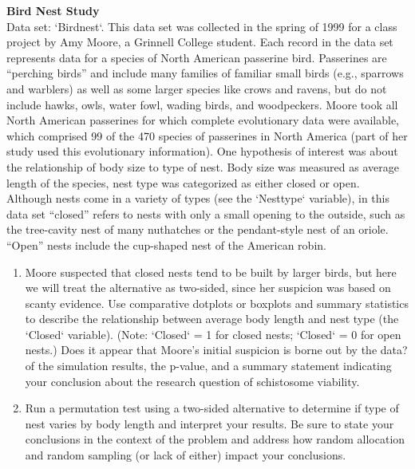 \documentclass[
]{report}
\begin{document}
\begin{list}{E.}{ \setlength{\itemsep}{0.5em}}
  \item \textbf{Bird Nest Study} \\
  Data set: `Birdnest`. This data set was collected in the spring of 1999 for a class project by Amy Moore, a Grinnell College
student. Each record in the data set represents data for a species of North American passerine
bird. Passerines are “perching birds” and include many families of familiar small birds (e.g., sparrows
and warblers) as well as some larger species like crows and ravens, but do not include hawks,
owls, water fowl, wading birds, and woodpeckers. Moore took all North American passerines for
which complete evolutionary data were available, which comprised 99 of the 470 species of passerines
in North America (part of her study used this evolutionary information). One hypothesis of
interest was about the relationship of body size to type of nest. Body size was measured as average
length of the species, nest type was categorized as either closed or open. Although nests come in
a variety of types (see the `Nesttype` variable), in this data set “closed” refers to nests with only a
small opening to the outside, such as the tree-cavity nest of many nuthatches or the pendant-style
nest of an oriole. “Open” nests include the cup-shaped nest of the American robin.
  \begin{enumerate}
    \setcounter{enumi}{0}  
    \item Moore suspected that closed nests tend to be built by larger birds, but here we will treat the alternative
as two-sided, since her suspicion was based on scanty evidence. Use comparative dotplots
or boxplots and summary statistics to describe the relationship between average body length
and nest type (the `Closed` variable). (Note: `Closed` = 1 for closed nests; `Closed` = 0 for open
nests.) Does it appear that Moore’s initial suspicion is borne out by the data?
of the simulation results, the p-value, and a summary statement indicating your conclusion
about the research question of schistosome viability.
    \item Run a permutation test using a two-sided alternative to determine if type of nest varies by body
length and interpret your results. Be sure to state your conclusions in the context of the problem and
address how random allocation and random sampling (or lack of either) impact your conclusions.
  \end{enumerate}
  

\end{list}
\end{document}
